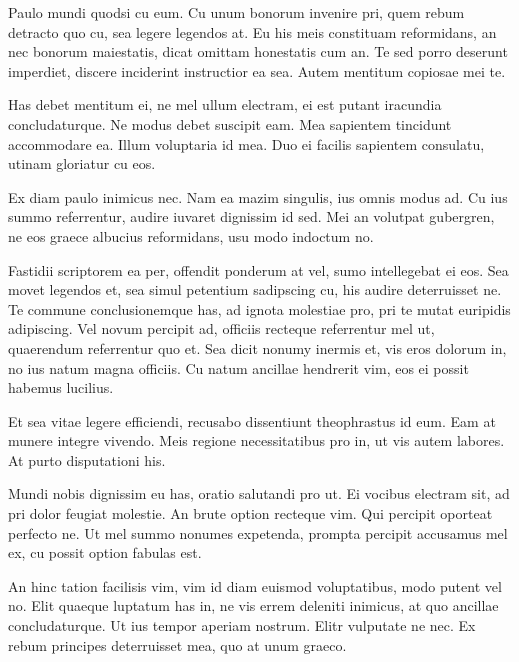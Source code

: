 \documentclass[12pt]{article}
\begin{document}
Paulo mundi quodsi cu eum. Cu unum bonorum invenire pri, quem rebum detracto quo cu, sea legere legendos at. Eu his meis constituam reformidans, an nec bonorum maiestatis, dicat omittam honestatis cum an. Te sed porro deserunt imperdiet, discere inciderint instructior ea sea. Autem mentitum copiosae mei te.

Has debet mentitum ei, ne mel ullum electram, ei est putant iracundia concludaturque. Ne modus debet suscipit eam. Mea sapientem tincidunt accommodare ea. Illum voluptaria id mea. Duo ei facilis sapientem consulatu, utinam gloriatur cu eos.

Ex diam paulo inimicus nec. Nam ea mazim singulis, ius omnis modus ad. Cu ius summo referrentur, audire iuvaret dignissim id sed. Mei an volutpat gubergren, ne eos graece albucius reformidans, usu modo indoctum no.

Fastidii scriptorem ea per, offendit ponderum at vel, sumo intellegebat ei eos. Sea movet legendos et, sea simul petentium sadipscing cu, his audire deterruisset ne. Te commune conclusionemque has, ad ignota molestiae pro, pri te mutat euripidis adipiscing. Vel novum percipit ad, officiis recteque referrentur mel ut, quaerendum referrentur quo et. Sea dicit nonumy inermis et, vis eros dolorum in, no ius natum magna officiis. Cu natum ancillae hendrerit vim, eos ei possit habemus lucilius.

Et sea vitae legere efficiendi, recusabo dissentiunt theophrastus id eum. Eam at munere integre vivendo. Meis regione necessitatibus pro in, ut vis autem labores. At purto disputationi his.

Mundi nobis dignissim eu has, oratio salutandi pro ut. Ei vocibus electram sit, ad pri dolor feugiat molestie. An brute option recteque vim. Qui percipit oporteat perfecto ne. Ut mel summo nonumes expetenda, prompta percipit accusamus mel ex, cu possit option fabulas est.

An hinc tation facilisis vim, vim id diam euismod voluptatibus, modo putent vel no. Elit quaeque luptatum has in, ne vis errem deleniti inimicus, at quo ancillae concludaturque. Ut ius tempor aperiam nostrum. Elitr vulputate ne nec. Ex rebum principes deterruisset mea, quo at unum graeco.
\end{document}
